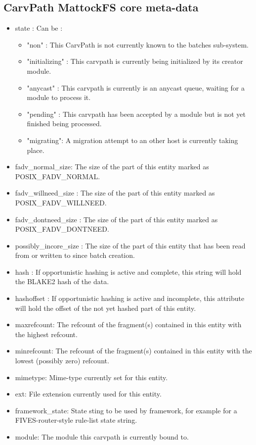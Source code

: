 \begin{itemize}
\begin{itemize}
\begin{itemize}
\begin{itemize}
\subsection{CarvPath MattockFS core meta-data}
\begin{itemize}
\item state : Can be :
\begin{itemize}
\item "non" : This CarvPath is not currently known to the batches sub-system. 
\item "initializing" : This carvpath is currently being initialized by its creator module.
\item "anycast" : This carvpath is currently is an anycast queue, waiting for a module to process it.
\item "pending" : This carvpath has been accepted by a module but is not yet finished being processed.
\item "migrating": A migration attempt to an other host is currently taking place.
\end{itemize}
\item fadv\_normal\_size: The size of the part of this entity marked as POSIX\_FADV\_NORMAL.
\item fadv\_willneed\_size : The size of the part of this entity marked as POSIX\_FADV\_WILLNEED.
\item fadv\_dontneed\_size : The size of the part of this entity marked as POSIX\_FADV\_DONTNEED.
\item possibly\_incore\_size : The size of the part of this entity that has been read from or written to since batch creation.
\item hash : If opportunistic hashing is active and complete, this string will hold the BLAKE2 hash of the data.
\item hashoffset : If opportunistic hashing is active and incomplete, this attribute will hold the offset of the not yet hashed part of this entity.
\item maxrefcount: The refcount of the fragment(s) contained in this entity with the highest refcount.
\item minrefcount: The refcount of the fragment(s) contained in this entity with the lowest (possibly zero) refcount.
\item mimetype: Mime-type currently set for this entity.
\item ext: File extension currently used for this entity.
\item framework\_state: State sting to be used by framework, for example for a FIVES-router-style rule-list state string. 
\item module: The module this carvpath is currently bound to.
\end{itemize}

\end{itemize}
\end{itemize}
\end{itemize}
\end{itemize}
